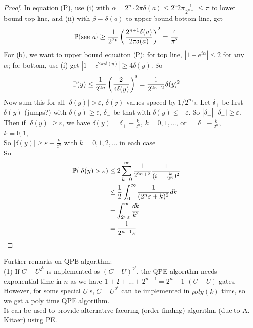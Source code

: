 \documentclass[a4paper]{article}
\begin{document}
\begin{thm}
\begin{proof}
        In equation (P), use (i) with $\alpha =2^n \cdot 2\pi \delta(a) \leq 2^n 2\pi \frac{1}{2^{n+1}} \leq \pi$ to lower bound top line, and (ii) with $\beta = \delta(a)$ to upper bound bottom line, get
        \begin{equation*}
            \begin{aligned}
                \P(\text{see } a) \geq \frac{1}{2^{2n}} \left(\frac{2^{n+1}\delta(a)}{2\pi \delta(a)}\right)^2 = \frac{4}{\pi^2}
            \end{aligned}
        \end{equation*}
        For (b), we want to upper bound equaiton (P): for top line, $|1-e^{i\alpha}| \leq 2$ for any $\alpha$; for bottom, use (i) get $|1-e^{2\pi i\delta(y)} | \geq 4\delta(y)$. So
        \begin{equation*}
            \begin{aligned}
                \P(y) \leq \frac{1}{2^{2n}} \left(\frac{2}{4\delta(y)}\right)^2 = \frac{1}{2^{2n+2}} \delta(y)^2
            \end{aligned}
        \end{equation*}
        Now sum this for all $|\delta(y)| > \varepsilon$, $\delta(y)$ values spaced by $1/2^n$'s. Let $\delta_+$ be first $\delta(y)$ (jumps?) with $\delta(y) \geq \varepsilon$, $\delta_-$ be that with $\delta(y) \leq -\varepsilon$. So $|\delta_+|,|\delta_-| \geq \varepsilon$.\\
        Then if $|\delta(y)| \geq \varepsilon$, we have $\delta(y) = \delta_+ + \frac{k}{2^n}$, $k=0,1,...$, or $=\delta_- - \frac{k}{2^n}$, $k=0,1,...$.\\
        So $|\delta(y)| \geq \varepsilon + \frac{k}{2^n}$ with $k=0,1,2,...$ in each case.\\
        So
        \begin{equation*}
            \begin{aligned}
                \P(|\delta(y) > \varepsilon) &\leq 2 \sum_{k=0}^\infty \frac{1}{2^{2n+2}} \frac{1}{(\varepsilon+\frac{k}{2^n})^2}\\
                &\leq \frac{1}{2} \int_0^\infty \frac{1}{(2^n \varepsilon+k)^2} dk\\
                &= \int_{2^n \varepsilon}^\infty \frac{dk}{k^2}\\
                &= \frac{1}{2^{n+1} \varepsilon}
            \end{aligned}
        \end{equation*}
    \end{proof}
\end{thm}

Further remarks on QPE algorithm:\\
(1) If $C-U^{2^k}$ is implemented as $(C-U)^{2^k}$, the QPE algorithm needs exponential time in $n$ as we have $1+2+...+2^{n-1} = 2^n-1$ $(C-U)$ gates.\\
However, for some special $U$'s, $C-U^{2^k}$ can be implemented in $poly(k)$ time, so we get a poly time QPE algorithm.\\
It can be used to provide alternative facoring (order finding) algorithm (due to A. Kitaer) using PE.
\end{document}
